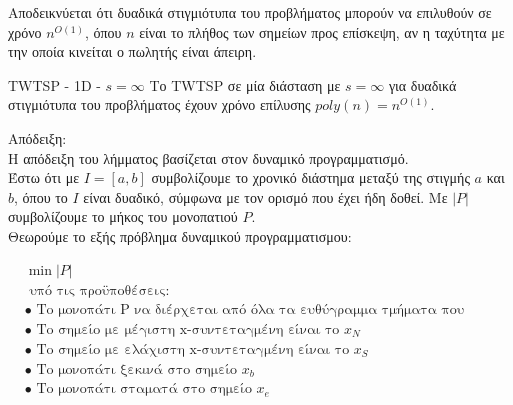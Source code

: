 \documentclass[oneside,12pt]{book}
\theoremstyle{definition}
\begin{document}
Αποδεικνύεται ότι δυαδικά στιγμιότυπα του προβλήματος μπορούν να επιλυθούν σε χρόνο \(n^{Ο(1)}\), όπου \(n\) είναι το πλήθος των σημείων προς επίσκεψη, αν η ταχύτητα με την οποία κινείται ο πωλητής είναι άπειρη. \\

\begin{mylemma}{TWTSP - 1D - \(s = \infty\)}{}
	Το TWTSP σε μία διάσταση με \(s = \infty\) για δυαδικά στιγμιότυπα του προβλήματος έχουν χρόνο επίλυσης \(poly(n) = n^{O(1)}\).
\end{mylemma}

Απόδειξη: \\
Η απόδειξη του λήμματος βασίζεται στον δυναμικό προγραμματισμό. \\
Έστω ότι με \(I = [a,b]\) συμβολίζουμε το χρονικό διάστημα μεταξύ της στιγμής \(a\) και \(b\), όπου το \(I\) είναι δυαδικό, σύμφωνα με τον ορισμό που έχει ήδη δοθεί. Με \(|P|\) συμβολίζουμε το μήκος του μονοπατιού \(P\). \\
Θεωρούμε το εξής πρόβλημα δυναμικού προγραμματισμου:

\begin{align*}
	&\min |P| \\
	&\text{ υπό τις προϋποθέσεις:} \\
	&\bullet \text{ Το μονοπάτι P να διέρχεται από όλα τα ευθύγραμμα τμήματα που βρίσκονται εντός του I} \\
	&\bullet \text{ Το σημείο με μέγιστη x-συντεταγμένη είναι το } x_N  \\
	&\bullet \text{ Το σημείο με ελάχιστη x-συντεταγμένη είναι το } x_S  \\
	&\bullet \text{ Το μονοπάτι ξεκινά στο σημείο } x_b \\
	&\bullet \text{ Το μονοπάτι σταματά στο σημείο } x_e
\end{align*}
\end{document}
